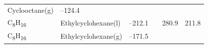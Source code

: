 \documentclass[
  9pt,
]{extbook}
\theoremstyle{definition}
\theoremstyle{definition}
\theoremstyle{definition}
\theoremstyle{remark}
\begin{document}
\begin{longtable}[]{@{}llllll@{}}
\begin{minipage}[t]{0.17\columnwidth}
Cyclooctane(g)\strut
\end{minipage} & \begin{minipage}[t]{0.15\columnwidth}\raggedright
--124.4\strut
\end{minipage} & \begin{minipage}[t]{0.15\columnwidth}\raggedright
\strut
\end{minipage} & \begin{minipage}[t]{0.14\columnwidth}\raggedright
\strut
\end{minipage} & \begin{minipage}[t]{0.14\columnwidth}\raggedright
\strut
\end{minipage}\tabularnewline
\begin{minipage}[t]{0.07\columnwidth}\raggedright
C\textsubscript{8}H\textsubscript{16}\strut
\end{minipage} & \begin{minipage}[t]{0.17\columnwidth}\raggedright
Ethylcyclohexane(l)\strut
\end{minipage} & \begin{minipage}[t]{0.15\columnwidth}\raggedright
--212.1\strut
\end{minipage} & \begin{minipage}[t]{0.15\columnwidth}\raggedright
\strut
\end{minipage} & \begin{minipage}[t]{0.14\columnwidth}\raggedright
280.9\strut
\end{minipage} & \begin{minipage}[t]{0.14\columnwidth}\raggedright
211.8\strut
\end{minipage}\tabularnewline
\begin{minipage}[t]{0.07\columnwidth}\raggedright
C\textsubscript{8}H\textsubscript{16}\strut
\end{minipage} & \begin{minipage}[t]{0.17\columnwidth}\raggedright
Ethylcyclohexane(g)\strut
\end{minipage} & \begin{minipage}[t]{0.15\columnwidth}\raggedright
--171.5\strut
\end{minipage} & \begin{minipage}[t]{0.15\columnwidth}\raggedright
\strut
\end{minipage} & \begin{minipage}[t]{0.14\columnwidth}\raggedright
\strut
\end{minipage} & \begin{minipage}[t]{0.14\columnwidth}\raggedright

\end{minipage}
\end{longtable}
\end{document}
